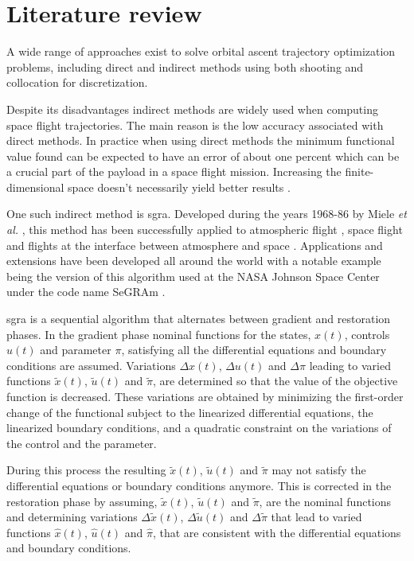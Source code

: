\section{Literature review}
A wide range of approaches exist to solve orbital ascent trajectory optimization problems, including direct and indirect methods using both shooting and collocation for discretization.

Despite its disadvantages indirect methods are widely used when computing space flight trajectories. The main reason is the low accuracy associated with direct methods. In practice when using direct methods the minimum functional value found can be expected to have an error of about one percent which can be a crucial part of the payload in a space flight mission. Increasing the finite-dimensional space doesn't necessarily yield better results \cite{von1992direct}.

One such indirect method is \acrfull{sgra}. Developed during the years 1968-86 by Miele \emph{et al.} \cite{miele1970sequential}, this method has been successfully applied to atmospheric flight \cite{miele1986optimal}, space flight \cite{miele1999optimaltransfers, miele2001optimaltrajectories} and flights at the interface between atmosphere and space \cite{miele1998optimal, miele1993nominal, miele2000feasibility, miele2001assessment}. Applications and extensions have been developed all around the world with a notable example being the version of this algorithm used at the NASA Johnson Space Center under the code name SeGRAm \cite{rishikof1992segram, miele2007optimal}.

\acrshort{sgra} is a sequential algorithm that alternates between gradient and restoration phases. In the gradient phase nominal functions for the states, $x(t)$, controls $u(t)$ and parameter $\pi$, satisfying all the differential equations and boundary conditions are assumed. Variations $\Delta x(t)$, $\Delta u(t)$ and $\Delta \pi$ leading to varied functions $\tilde x(t)$, $\tilde u(t)$ and $\tilde \pi$, are determined so that the value of the objective function is decreased. These variations are obtained by minimizing the first-order change of the functional subject to the linearized differential equations, the linearized boundary conditions, and a quadratic constraint on the variations of the control and the parameter. 

During this process the resulting $\tilde x(t)$, $\tilde u(t)$ and $\tilde \pi$ may not satisfy the differential equations or boundary conditions anymore. This is corrected in the restoration phase by assuming, $\tilde x(t)$, $\tilde u(t)$ and $\tilde \pi$, are the nominal functions and determining variations $\Delta \tilde x(t)$, $\Delta \tilde u(t)$ and $\Delta \tilde \pi$ that lead to varied functions $\hat x(t)$, $\hat u(t)$ and $\hat \pi$, that are consistent with the differential equations and boundary conditions.

